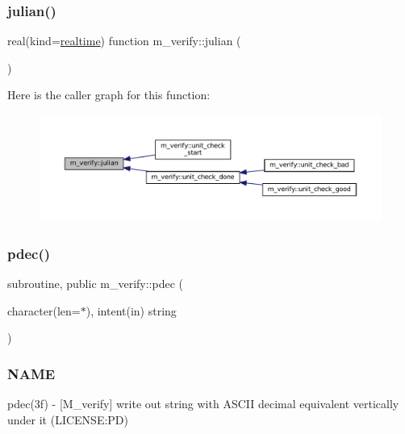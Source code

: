 \subsubsection{\texorpdfstring{julian()}{julian()}}
{\footnotesize\ttfamily real(kind=\mbox{\hyperlink{namespacem__verify_a7f6aa94b09b3824bc5c15bc74e757d6b}{realtime}}) function m\+\_\+verify\+::julian (\begin{DoxyParamCaption}{ }\end{DoxyParamCaption})\hspace{0.3cm}{\ttfamily [private]}}

Here is the caller graph for this function\+:\nopagebreak
\begin{figure}[H]
\begin{center}
\leavevmode
\includegraphics[width=350pt]{namespacem__verify_a1a97667eb1d53ce5b97a60c4a9ebe565_icgraph}
\end{center}
\end{figure}
\mbox{\label{namespacem__verify_aa772ce395fd2e4cc546b8645d8fd9949}} 
\subsubsection{\texorpdfstring{pdec()}{pdec()}}
{\footnotesize\ttfamily subroutine, public m\+\_\+verify\+::pdec (\begin{DoxyParamCaption}\item[{character(len=$\ast$), intent(in)}]{string }\end{DoxyParamCaption})}



\subsubsection*{N\+A\+ME}

pdec(3f) -\/ \mbox{[}M\+\_\+verify\mbox{]} write out string with A\+S\+C\+II decimal equivalent vertically under it (L\+I\+C\+E\+N\+SE\+:PD) 


